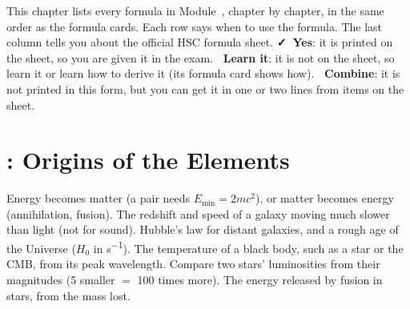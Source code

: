 \label{fs:chap}

This chapter lists every formula in Module~\modulenumber, chapter by chapter, in the same
order as the formula cards. Each row says when to use the formula. The last column tells
you about the official HSC formula sheet.
\textcolor{hscformula}{\bfseries\faCheck\ Yes}: it is printed on the sheet, so you are given
it in the exam. \textcolor{hscmistake}{\bfseries\faTimes\ Learn it}: it is not on the sheet,
so learn it or learn how to derive it (its formula card shows how).
\textcolor{hsctiptext}{\bfseries\faLink\ Combine}: it is not printed in this form, but you
can get it in one or two lines from items on the sheet.

\section*{: Origins of the Elements}
\begin{formulatable}
    {Energy becomes matter (a pair needs $E_\mathrm{min} = 2mc^2$), or matter becomes
     energy (annihilation, fusion).}
    {The redshift and speed of a galaxy moving much slower than light (not for sound).}
    {Hubble's law for distant galaxies, and a rough age of the Universe ($H_0$ in
     \si{s^{-1}}).}
    {The temperature of a black body, such as a star or the CMB, from its peak wavelength.}
    {Compare two stars' luminosities from their magnitudes (5 smaller $=$ 100 times more).}
    {The energy released by fusion in stars, from the mass lost.}
\end{formulatable}

